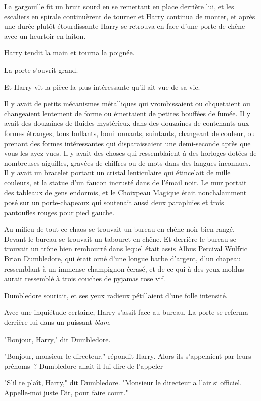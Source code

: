 La gargouille fit un bruit sourd en se remettant en place derrière lui, et les escaliers en spirale continuèrent de tourner et Harry continua de monter, et après une durée plutôt étourdissante Harry se retrouva en face d'une porte de chêne avec un heurtoir en laiton.

Harry tendit la main et tourna la poignée.

La porte s'ouvrit grand.

Et Harry vit la pièce la plus intéressante qu'il ait vue de sa vie.

Il y avait de petits mécanismes métalliques qui vrombissaient ou cliquetaient ou changeaient lentement de forme ou émettaient de petites bouffées de fumée. Il y avait des douzaines de fluides mystérieux dans des douzaines de contenants aux formes étranges, tous bullants, bouillonnants, suintants, changeant de couleur, ou prenant des formes intéressantes qui disparaissaient une demi-seconde après que vous les ayez vues. Il y avait des choses qui ressemblaient à des horloges dotées de nombreuses aiguilles, gravées de chiffres ou de mots dans des langues inconnues. Il y avait un bracelet portant un cristal lenticulaire qui étincelait de mille couleurs, et la statue d'un faucon incrusté dans de l'émail noir. Le mur portait des tableaux de gens endormis, et le Choixpeau Magique était nonchalamment posé sur un porte-chapeaux qui soutenait aussi deux parapluies et trois pantoufles rouges pour pied gauche.

Au milieu de tout ce chaos se trouvait un bureau en chêne noir bien rangé. Devant le bureau se trouvait un tabouret en chêne. Et derrière le bureau se trouvait un trône bien rembourré dans lequel était assis Albus Percival Wulfric Brian Dumbledore, qui était orné d'une longue barbe d'argent, d'un chapeau ressemblant à un immense champignon écrasé, et de ce qui à des yeux moldus aurait ressemblé à trois couches de pyjamas rose vif.

Dumbledore souriait, et ses yeux radieux pétillaient d'une folle intensité.

Avec une inquiétude certaine, Harry s'assit face au bureau. La porte se referma derrière lui dans un puissant \emph{blam}.

"Bonjour, Harry," dit Dumbledore.

"Bonjour, monsieur le directeur," répondit Harry. Alors ils s'appelaient par leurs prénoms~? Dumbledore allait-il lui dire de l'appeler~-

"S'il te plaît, Harry," dit Dumbledore. "Monsieur le directeur a l'air si officiel. Appelle-moi juste Dir, pour faire court."

